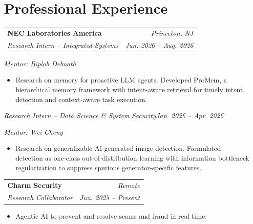 \documentclass[10pt,letterpaper]{article}
\makeatletter
\newenvironment{sectionbody}{\begin{list}{}{\setlength{\leftmargin}{12pt}\setlength{\rightmargin}{0pt}\setlength{\topsep}{0pt}\setlength{\partopsep}{0pt}\setlength{\parsep}{0pt}\setlength{\itemsep}{0pt}}\item[]}{\end{list}}
\newcommand{\entry}[4]{\begin{tabularx}{\linewidth}{@{}Xr@{}}\textbf{#1}&\textit{#2}\\\textit{#3}&\textit{#4}\end{tabularx}}
\newcommand{\role}[2]{\textit{#1}\hfill\textit{#2}\par}
\makeatother
\begin{document}
\section{Professional Experience}
\begin{sectionbody}
\entry{NEC Laboratories America}{Princeton, NJ}{Research Intern -- Integrated Systems}{Jun. 2026 -- Aug. 2026}
\textit{Mentor: Biplob Debnath}\par
\begin{itemize}
\item Research on memory for proactive LLM agents. Developed ProMem, a hierarchical memory framework with intent-aware retrieval for timely intent detection and context-aware task execution.
\end{itemize}
\role{Research Intern -- Data Science \& System Security}{Jan. 2026 -- Apr. 2026}
\textit{Mentor: Wei Cheng}\par
\begin{itemize}
\item Research on generalizable AI-generated image detection. Formulated detection as one-class out-of-distribution learning with information bottleneck regularization to suppress spurious generator-specific features.
\end{itemize}
\vspace{3pt}
\entry{Charm Security}{Remote}{Research Collaborator}{Jun. 2025 -- Present}
\begin{itemize}\item Agentic AI to prevent and resolve scams and fraud in real time.\end{itemize}
\end{sectionbody}
\end{document}
